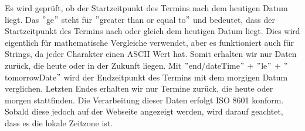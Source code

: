 Es wird geprüft, ob der Startzeitpunkt des Termins nach dem heutigen Datum liegt.
Das \("\)ge\("\) steht für \("\)greater than or equal to\("\) und bedeutet, dass der Startzeitpunkt des Termins nach oder gleich dem heutigen Datum liegt.
Dies wird eigentlich für mathematische Vergleiche verwendet, aber es funktioniert auch für Strings, da jeder Charakter einen ASCII Wert hat.
\newline
Somit erhalten wir nur Daten zurück, die heute oder in der Zukunft liegen.
\newline
Mit \("\)end/dateTime\("\) + \("\)le\("\) + \("\) {tomorrowDate}\("\) wird der Endzeitpunkt des Termins mit dem morgigen Datum verglichen.
Letzten Endes erhalten wir nur Termine zurück, die heute oder morgen stattfinden.
Die Verarbeitung dieser Daten erfolgt ISO 8601 konform.
Sobald diese jedoch auf der Webseite angezeigt werden, wird darauf geachtet, dass es die lokale Zeitzone ist.
\newline
